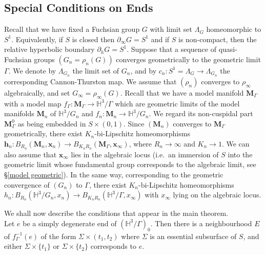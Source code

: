 \documentclass{amsart}
\theoremstyle{definition}
\newcommand\HHH{{\mathbb H}}
\begin{document}
\subsection{Special Conditions on Ends}
\label{ends}
 Recall that we have fixed a Fuchsian group $G$ with
limit set $\Lambda_G$  homeomorphic to $S^1$. Equivalently, if $S$ is closed then $\partial_\infty G = S^1$ and if $S$ is non-compact, then the relative hyperbolic boundary $\partial_h G = S^1$.
Suppose that a sequence of quasi-Fuchsian groups $(G_n = \rho_n(G))$ converges geometrically to the geometric limit $\Gamma$.
We denote by $\Lambda_{G_n}$  the limit set of $G_n$, and
by $c_n : S^1=\Lambda_G \rightarrow \Lambda_{G_n}$  the corresponding Cannon-Thurston map. We assume that $(\rho_n)$ converges to $\rho_\infty$ algebraically, and set $G_\infty=\rho_\infty(G)$.
Recall that we have a model manifold $\mathbf M_\Gamma$ with a model map $f_\Gamma \colon \mathbf M_\Gamma \to \HHH^3/\Gamma$ which are geometric limits of the model manifolds $\mathbf M_n$ of $\HHH^3/G_n$ and $f_n \colon \mathbf M_n \to \HHH^3/G_n$.
 We regard its non-cuspidal part  $\mathbf M_\Gamma^0$ as being embedded in $S \times (0,1)$.
Since  $(\mathbf M_n)$ converges to $\mathbf M_\Gamma$ geometrically, there exist $K_n$-bi-Lipschitz homeomorphisms $\mathbf h_n\colon B_{R_n}(\mathbf M_n, \mathbf x_n) \rightarrow B_{K_n R_n}(\mathbf M_\Gamma, \mathbf x_\infty)$, where $R_n \rightarrow \infty$ and $K_n \to 1$. We can also assume that $\mathbf x_\infty$ lies in the algebraic locus (i.e.\ an immersion of $S$ into the geometric limit whose fundamental group corresponds to the algebraic limit, see \S \ref{model geometric}).
In the same way, corresponding to the geometric convergence of $(G_n)$ to $\Gamma$, there exist $K_n$-bi-Lipschitz homeomorphisms $h_n \colon B_{R_n}(\HHH^3/G_n, x_n) \to B_{K_nR_n}(\HHH^3/\Gamma, x_\infty)$ with $x_\infty$ lying on the algebraic locus.

We shall now describe the conditions that appear in the main theorem.\\

Let $e$ be a simply degenerate end  of $(\HHH^3/\Gamma)_0$. Then there is a neighbourhood $E$ of $f_\Gamma^{-1}(e)$ of the form $\Sigma \times (t_1, t_2)$ where  $\Sigma$ is an essential subsurface of $S$, and either $\Sigma \times \{t_1\}$ or $\Sigma \times \{t_2\}$ corresponds to $e$.
\end{document}
